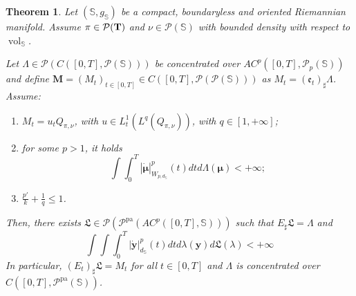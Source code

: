\documentclass[10pt,leqno]{amsart}
\numberwithin{equation}{section}
\newtheorem{teorema}{Theorem}[section]
\newcommand{\Q}{\mathbb{Q}}
\newcommand{\PP}{\mathcal{P}}
\newcommand{\PPpa}{\PP^{\operatorname{pa}}}
\renewcommand{\Q}{Q}
\newcommand{\Ss}{\mathbb{S}}
\begin{document}
\begin{teorema}\label{main theorem metric manifold}
    Let $(\mathbb{S},g_{\mathbb{S}})$ be a compact, boundaryless and oriented Riemannian manifold. Assume $\pi \in \PP(\bold{T})$ and $\nu\in \PP(\Ss)$ with bounded density with respect to $\operatorname{vol}_\Ss$.
    
    Let $\Lambda \in \PP(C([0,T],\PP(\mathbb{S})))$ be concentrated over $AC^p([0,T],\PP_p(\mathbb{S}))$ and define $\boldsymbol{M} = (M_t)_{t\in[0,T]} \in C([0,T],\PP(\PP(\mathbb{S})))$ as $M_t = (\mathfrak{e}_t)_\sharp \Lambda$. Assume:
    \begin{enumerate}
        \item $M_t = u_t \Q_{\pi,\nu}$, with $u \in L^1_t(L^q(\Q_{\pi,\nu}))$, with $q\in[1,+\infty]$;
        \item for some $p>1$, it holds
        \begin{equation}
            \int\int_0^T |\dot{\boldsymbol{\mu}}|_{W_{p,d_\Ss}}^p(t)dt d\Lambda(\boldsymbol{\mu})<+\infty;
        \end{equation}
        \item $\frac{p'}{k}+\frac{1}{q}\leq1$. 
    \end{enumerate}
    Then, there exists $\mathfrak{L}\in \PP(\PPpa(AC^p([0,T],\Ss)))$ such that $E_\sharp \mathfrak{L} = \Lambda$ and 
    \begin{equation}\label{eq: minimal lifting riem}
        \int\int\int_0^T |\dot{\boldsymbol{y}}|^p_{d_{\mathbb{S}}}(t) dt d\lambda (\boldsymbol{y})d\mathfrak{L}(\lambda) <+\infty
    \end{equation} In particular, $(E_t)_\sharp \mathfrak{L} = M_t$ for all $t\in[0,T]$ and $\Lambda$ is concentrated over $C([0,T],\PP^{\operatorname{pa}}(\mathbb{S}))$.
\end{teorema}
\end{document}
